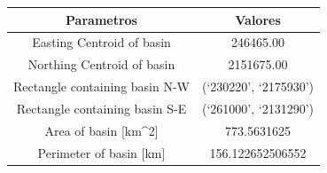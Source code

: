\documentclass[11pt,]{article}
\begin{document}
\begin{longtable}[]{@{}cc@{}}
\toprule
\begin{minipage}[b]{0.65\columnwidth}\centering\strut
Parametros\strut
\end{minipage} & \begin{minipage}[b]{0.29\columnwidth}\centering\strut
Valores\strut
\end{minipage}\tabularnewline
\midrule
\endhead
\begin{minipage}[t]{0.65\columnwidth}\centering\strut
Easting Centroid of basin\strut
\end{minipage} & \begin{minipage}[t]{0.29\columnwidth}\centering\strut
246465.00\strut
\end{minipage}\tabularnewline
\begin{minipage}[t]{0.65\columnwidth}\centering\strut
Northing Centroid of basin\strut
\end{minipage} & \begin{minipage}[t]{0.29\columnwidth}\centering\strut
2151675.00\strut
\end{minipage}\tabularnewline
\begin{minipage}[t]{0.65\columnwidth}\centering\strut
Rectangle containing basin N-W\strut
\end{minipage} & \begin{minipage}[t]{0.29\columnwidth}\centering\strut
(`230220', `2175930')\strut
\end{minipage}\tabularnewline
\begin{minipage}[t]{0.65\columnwidth}\centering\strut
Rectangle containing basin S-E\strut
\end{minipage} & \begin{minipage}[t]{0.29\columnwidth}\centering\strut
(`261000', `2131290')\strut
\end{minipage}\tabularnewline
\begin{minipage}[t]{0.65\columnwidth}\centering\strut
Area of basin {[}km\^{}2{]}\strut
\end{minipage} & \begin{minipage}[t]{0.29\columnwidth}\centering\strut
773.5631625\strut
\end{minipage}\tabularnewline
\begin{minipage}[t]{0.65\columnwidth}\centering\strut
Perimeter of basin {[}km{]}\strut
\end{minipage} & \begin{minipage}[t]{0.29\columnwidth}\centering\strut
156.122652506552\strut

\end{minipage}
\end{longtable}
\end{document}
